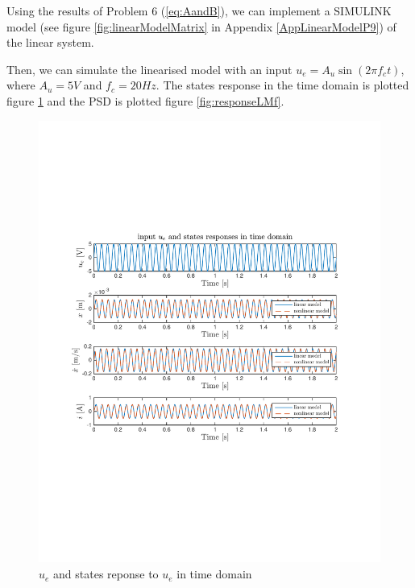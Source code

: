 Using the results of Problem 6 (\ref{eq:AandB}), we can implement a SIMULINK model (see figure \ref{fig:linearModelMatrix} in Appendix \ref{AppLinearModelP9}) of the linear system.

Then, we can simulate the linearised model with an input $u_e=A_u\sin(2\pi f_ct)$, where $A_u=5V$ and $f_c=20Hz$. The states response in the time domain is plotted figure \ref{fig:responseLMt} and the PSD is plotted figure \ref{fig:responseLMf}.

\begin{figure}[H]
 \centering 
\includegraphics[trim=2cm 7cm 2cm 7cm, clip=true, totalheight=0.35\textheight, angle=0]{figures/p9time.pdf}
\caption{$u_e$ and states reponse to $u_e$ in time domain}
\label{fig:responseLMt}
\end{figure}
